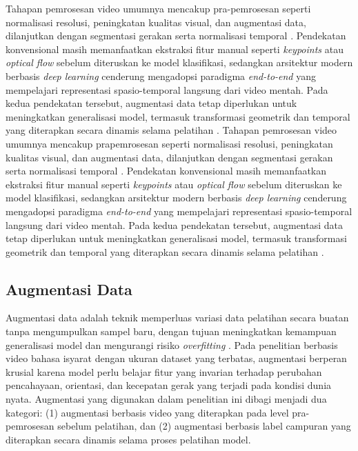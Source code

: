 Tahapan pemrosesan video umumnya mencakup pra-pemrosesan seperti normalisasi resolusi, peningkatan kualitas visual, dan augmentasi data, dilanjutkan dengan segmentasi gerakan serta normalisasi temporal \cite{MHNugraha2022,wang2024comprehensive,alfarano2024estimating}. Pendekatan konvensional masih memanfaatkan ekstraksi fitur manual seperti \textit{keypoints} atau \textit{optical flow} sebelum diteruskan ke model klasifikasi, sedangkan arsitektur modern berbasis \textit{deep learning} cenderung mengadopsi paradigma \textit{end-to-end} yang mempelajari representasi spasio-temporal langsung dari video mentah. Pada kedua pendekatan tersebut, augmentasi data tetap diperlukan untuk meningkatkan generalisasi model, termasuk transformasi geometrik dan temporal yang diterapkan secara dinamis selama pelatihan \cite{IGoodfellow2016,li2023advancements,AIMS2024}.
Tahapan pemrosesan video umumnya mencakup prapemrosesan seperti normalisasi resolusi, peningkatan kualitas visual, dan augmentasi data, dilanjutkan dengan segmentasi gerakan serta normalisasi temporal \cite{MHNugraha2022,wang2024comprehensive,alfarano2024estimating}. Pendekatan konvensional masih memanfaatkan ekstraksi fitur manual seperti \textit{keypoints} atau \textit{optical flow} sebelum diteruskan ke model klasifikasi, sedangkan arsitektur modern berbasis \textit{deep learning} cenderung mengadopsi paradigma \textit{end-to-end} yang mempelajari representasi spasio-temporal langsung dari video mentah. Pada kedua pendekatan tersebut, augmentasi data tetap diperlukan untuk meningkatkan generalisasi model, termasuk transformasi geometrik dan temporal yang diterapkan secara dinamis selama pelatihan \cite{IGoodfellow2016,li2023advancements,AIMS2024}.



\subsection{Augmentasi Data} \label{II.Augmentasi}
Augmentasi data adalah teknik memperluas variasi data pelatihan secara buatan tanpa mengumpulkan sampel baru, dengan tujuan meningkatkan kemampuan generalisasi model dan mengurangi risiko \textit{overfitting} \cite{AIMS2024,wang2024comprehensive}. Pada penelitian berbasis video bahasa isyarat dengan ukuran dataset yang terbatas, augmentasi berperan krusial karena model perlu belajar fitur yang invarian terhadap perubahan pencahayaan, orientasi, dan kecepatan gerak yang terjadi pada kondisi dunia nyata. Augmentasi yang digunakan dalam penelitian ini dibagi menjadi dua kategori: (1) augmentasi berbasis video yang diterapkan pada level pra-pemrosesan sebelum pelatihan, dan (2) augmentasi berbasis label campuran yang diterapkan secara dinamis selama proses pelatihan model.

